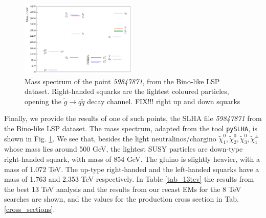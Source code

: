 \documentclass[a4paper,11pt]{article}
\begin{document}
\begin{figure} 
	\begin{center}		
		\includegraphics[width=0.49\textwidth]{PLOTS/13TeV/59847871.pdf}
	\end{center}
	\caption{Mass spectrum of the point \textit{59847871}, from the Bino-like LSP dataset. Right-handed squarks are the lightest coloured particles, opening the $\tilde g \rightarrow q \tilde q $ decay channel. {\color{blue} FIX!!! right up and down squarks}} 
	\label{pyslha}
\end{figure}

Finally, we provide the results of one of such points, the SLHA file \textit{59847871} from the Bino-like LSP dataset. The mass spectrum, adapted from the tool \texttt{pySLHA}\cite{Buckley:2013jua}, is shown in Fig. \ref{pyslha}. We see that, besides the light neutralinos/chargino $\tilde \chi _1 ^0,\tilde \chi _2 ^0,\tilde \chi _3 ^0,\tilde \chi _1 ^{\pm}$ whose mass lies around 500 GeV, the lightest SUSY particles are down-type right-handed squark, with mass of 854 GeV. The gluino is slightly heavier, with a mass of 1.072 TeV. The up-type right-handed and the left-handed squarks have a mass of 1.763 and 2.353 TeV respectively. In Table \ref{tab_13tev} the results from the best 13 TeV analysis and the results from our recast EMs for the 8 TeV searches are shown, and the values for the production cross section in Tab. \ref{cross_sections}. 
%
%
\end{document}
